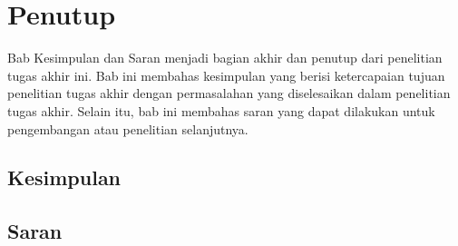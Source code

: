 \chapter{Penutup}

Bab Kesimpulan dan Saran  menjadi bagian akhir dan penutup dari penelitian tugas akhir ini. Bab ini  membahas kesimpulan yang berisi ketercapaian tujuan penelitian tugas akhir dengan permasalahan yang diselesaikan dalam penelitian tugas akhir. Selain itu, bab ini  membahas saran yang dapat dilakukan untuk pengembangan atau penelitian selanjutnya.

\section{Kesimpulan}

\section{Saran}
